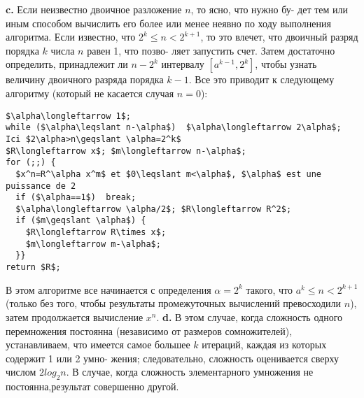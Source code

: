 \textbf{c.} Если неизвестно двоичное разложение $n$, то ясно, что нужно бу-\linebreak
дет тем или иным способом вычислить его более или менее неявно по\linebreak
ходу выполнения алгоритма. Если известно, что $2^k \leqslant n < 2^{k+1}$, то это\linebreak
влечет, что двоичный разряд порядка $k$ числа $n$ равен 1, что позво-\linebreak
ляет запустить счет. Затем достаточно определить, принадлежит ли\linebreak
$n-2^k$ интервалу $[a^{k-1},2^k]$, чтобы узнать величину двоичного разряда\linebreak
порядка $k-1$. Все это приводит к следующему алгоритму (который не\linebreak
касается случая $n=0$):
\begin{lstlisting}[xleftmargin=15pt, mathescape=true]
$\alpha\longleftarrow 1$;
while ($\alpha\leqslant n-\alpha$)  $\alpha\longleftarrow 2\alpha$;
Ici $2\alpha>n\geqslant \alpha=2^k$
$R\longleftarrow x$; $m\longleftarrow n-\alpha$;
for (;;) {
  $x^n=R^\alpha x^m$ et $0\leqslant m<\alpha$, $\alpha$ est une puissance de 2
  if ($\alpha==1$)  break;
  $\alpha\longleftarrow \alpha/2$; $R\longleftarrow R^2$;
  if ($m\geqslant \alpha$) {
    $R\longleftarrow R\times x$;
    $m\longleftarrow m-\alpha$;
  }}
return $R$;
\end{lstlisting}
\hspace*{15pt}В этом алгоритме все начинается с определения $\alpha=2^k$ такого, что\linebreak
$a^k \leqslant n < 2^{k+1}$ (только без того, чтобы результаты промежуточных\linebreak
вычислений превосходили $n$), затем продолжается вычисление $x^n$.\newline
\hspace*{15pt}\textbf{d.} В этом случае, когда сложность одного перемножения постоянна\linebreak
(независимо от размеров сомножителей), устанавливаем, что имеется\linebreak
самое большее $k$ итераций, каждая из которых содержит 1 или 2 умно-\linebreak
жения; следовательно, сложность оценивается сверху числом $2log_2n$.\newline
\hspace*{15pt}В случае, когда сложность элементарного умножения не постоянна,\linebreak результат совершенно другой.\\

